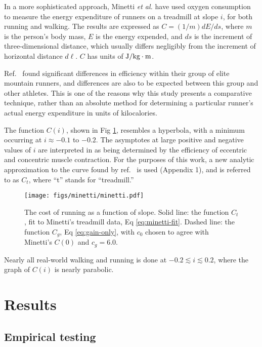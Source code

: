 \documentclass[10pt,letterpaper]{article}
\begin{document}
In a more sophisticated approach, Minetti \emph{et al.}\cite{minetti} have used oxygen
consumption to measure the energy expenditure of runners on a treadmill at slope $i$, for both
running and walking.
The results are expressed as $C=(1/m)d E/d s$, where $m$ is the person's body mass,
$E$ is the energy expended, and $d s$ is the increment of three-dimensional distance, which
usually differs negligibly from the increment of horizontal distance $d \ell$.
$C$ has units of $\textup{J}/\textup{kg}\cdot\textup{m}$.

Ref.~\cite{minetti} found significant differences in efficiency within their group of elite mountain
runners, and differences are also to be expected between this group and other athletes. This is one
of the reasons why this study presents a comparative technique, rather than an absolute method for
determining a particular runner's actual energy expenditure in units of kilocalories.

The function $C(i)$, shown in Fig \ref{fig:minetti}, resembles a hyperbola, with a
minimum occurring at $i\approx -0.1$ to $-0.2$. 
The asymptotes
at large positive and negative values of $i$ are interpreted in \cite{minetti} as being determined by the
efficiency of eccentric and concentric muscle contraction. For the purposes of this work, a new analytic
approximation to the curve found by ref.~\cite{minetti} is used (Appendix 1), and is referred to as
$C_t$, where ``t'' stands for ``treadmill.''

\begin{figure}[h]
\texttt{[image: figs/minetti/minetti.pdf]}
\centering
\caption{The cost of running as a function of slope. Solid line: the function $C_t$, fit to Minetti's treadmill data, Eq \ref{eq:minetti-fit}. Dashed line:
the function $C_g$, Eq \ref{eq:gain-only}, with $c_0$ chosen to agree with Minetti's $C(0)$ and $c_g=6.0$.}
\label{fig:minetti}
\end{figure}

Nearly all real-world walking and running is
done at $-0.2 \lesssim i \lesssim 0.2$, where the graph of $C(i)$ is nearly parabolic.

\section{Results}

\subsection{Empirical testing}
\end{document}
